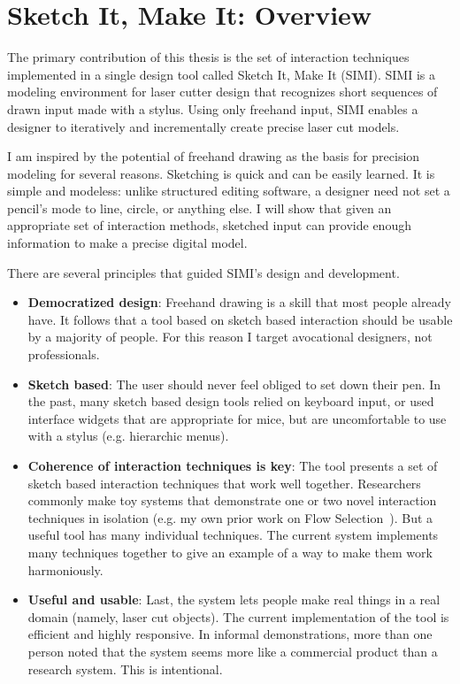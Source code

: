 \chapter{Sketch It, Make It: Overview}
\label{sec:overview}

The primary contribution of this thesis is the set of interaction
techniques implemented in a single design tool called Sketch It, Make
It (SIMI). SIMI is a modeling environment for laser cutter design that
recognizes short sequences of drawn input made with a stylus. Using
only freehand input, SIMI enables a designer to iteratively and
incrementally create precise laser cut models.

I am inspired by the potential of freehand drawing as the basis for
precision modeling for several reasons. Sketching is quick and can be
easily learned. It is simple and modeless: unlike structured editing
software, a designer need not set a pencil's mode to line, circle, or
anything else. I will show that given an appropriate set of
interaction methods, sketched input can provide enough information to
make a precise digital model.

There are several principles that guided SIMI's design and development.

\begin{itemize}
\item \textbf{Democratized design}: Freehand drawing is a skill that
  most people already have. It follows that a tool based on sketch
  based interaction should be usable by a majority of people. For this
  reason I target avocational designers, not professionals. 
\item \textbf{Sketch based}: The user should never feel obliged to set
  down their pen. In the past, many sketch based design tools relied
  on keyboard input, or used interface widgets that are appropriate
  for mice, but are uncomfortable to use with a stylus
  (e.g. hierarchic menus).
\item \textbf{Coherence of interaction techniques is key}: The tool
  presents a set of sketch based interaction techniques that work well
  together. Researchers commonly make toy systems that demonstrate one
  or two novel interaction techniques in isolation (e.g. my own prior
  work on Flow Selection~\cite{johnson-flow-selection}). But a useful
  tool has many individual techniques. The current system implements
  many techniques together to give an example of a way to make them
  work harmoniously.
\item \textbf{Useful and usable}: Last, the system lets people make
  real things in a real domain (namely, laser cut objects). The
  current implementation of the tool is efficient and highly
  responsive. In informal demonstrations, more than one person noted
  that the system seems more like a commercial product than a research
  system. This is intentional.
\end{itemize}

